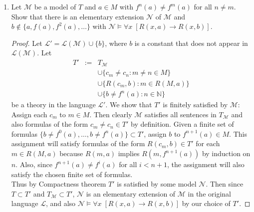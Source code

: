 \documentclass{article}
\begin{document}
\begin{enumerate}[label={\bf Q\arabic*:}]
\begin{enumerate}
\begin{proof}
          These relations will ensure that $\mathcal{N}$ is a model of $T$.
          Also, since $b\neq f^n(a)$ for all $n\in\mathbb{N}$, $c$ will
          witness $\mathcal{N}\models \exists x\; (R(x,a)\wedge\neg
          R(x,b))$. Also, since the new relations each involve the new
          element $c$, $\mathcal{N}$ is an extension of $\mathcal{M}$.
          Thus, from existential closure of $\mathcal{M}$, we have
          $\mathcal{M}\models \exists x\; (R(x,a)\wedge\neg R(x,b))$, a
          contradiction.
        \end{proof}

      \item Let $\mathcal{M}$ be a model of $T$ and $a\in M$ with
        $f^n(a)\neq f^m(a)$ for all $n\neq m$. Show that there is an
        elementary extension $\mathcal{N}$ of $\mathcal{M}$ and
        $b\not\in\{a,f(a),f^2(a),\ldots\}$ with $\mathcal{N}\models\forall
        x\; [R(x,a)\rightarrow R(x,b)]$.

        \begin{proof}
          Let $\mathcal{L}'=\mathcal{L}(\mathcal{M})\cup\{b\}$, where $b$
          is a constant that does not appear in $\mathcal{L}(\mathcal{M})$.
          Let
          \[\begin{array}{rrl}
            T' &:= &T_\mathcal{M} \\
              &&\cup \{c_m\neq c_n:m\neq n\in M\} \\
              &&\cup\{R(c_m,b):m\in R(M,a)\} \\
              &&\cup\{b\neq f^n(a):n\in\mathbb{N}\}
          \end{array}\]
          be a theory in the language $\mathcal{L}'$. We show that
          $T'$ is finitely satisfied by $\mathcal{M}$: Assign each $c_m$ to
          $m\in M$. Then clearly $\mathcal{M}$ satisfies all sentences in
          $T_\mathcal{M}$ and also formulas of the form $c_m\neq c_n\in
          T'$ by definition. Given a finite set of formulas
          $\{b\neq f^{0}(a),\ldots,b\neq f^{n}(a)\}\subset T'$, assign $b$
          to $f^{n+1}(a)\in M$. This assignment will satisfy formulas of
          the form $R(c_m,b)\in T'$ for each $m\in R(M,a)$ because $R(m,a)$
          implies $R(m,f^{n+1}(a))$ by induction on $n$. Also, since
          $f^{n+1}(a)\neq f^i(a)$ for all $i<n+1$, the assignment will also
          satisfy the chosen finite set of formulas. \\

          Thus by Compactness theorem $T'$ is satisfied by some model
          $\mathcal{N}$. Then since $T\subset T'$ and $T_\mathcal{M}\subset
          T'$, $\mathcal{N}$ is an elementary extension of $\mathcal{M}$ in
          the original language $\mathcal{L}$, and also
          $\mathcal{N}\models\forall x\; [R(x,a)\rightarrow R(x,b)]$ by our
          choice of $T'$.
        \end{proof}


\end{enumerate}
\end{enumerate}
\end{document}
